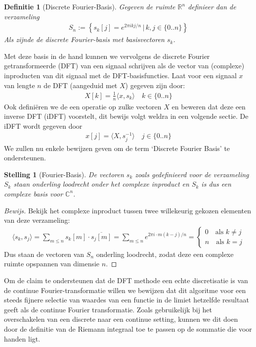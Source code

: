 \documentclass[11pt]{report}
\newcommand{\R}{\mathbb{R}}
\newcommand{\C}{\mathbb{C}}
\newtheorem*{stelling}{Stelling}
\newtheorem*{definitie}{Definitie}
\theoremstyle{remark}
\newcommand{\eq}[1]{\begin{eqnarray*} #1 \end{eqnarray*}}
\newcommand{\largediv}{\,\big|\,}
\newcommand{\inpr}[2]{\langle #1 , #2 \rangle}
\newcommand{\dpii}{{2\pi i}}
\begin{document}
\begin{definitie}[Discrete Fourier-Basis] Gegeven de ruimte $\R^n$ definieer dan de verzameling
\eq{
  S_n := \left\{ s_k [j] = e^{\dpii k j/n } \largediv k,j \in \{0..n\} \right\}
}
Als zijnde de discrete Fourier-basis met basisvectoren $s_k$.
\end{definitie}
Met deze basis in de hand kunnen we vervolgens de discrete Fourier getransformeerde (DFT) van een signaal schrijven als de vector van (complexe) inproducten van dit signaal met de DFT-basisfuncties. Laat voor een signaal $x$ van lengte $n$ de DFT (aangeduid met $X$) gegeven zijn door:
\eq{
  X[k] = \tfrac{1}{n} \inpr{x}{s_k} \quad k\in\{0..n\}
}
Ook defini\"eren we de een operatie op zulke vectoren $X$ en beweren dat deze een inverse DFT (iDFT) voorstelt, dit bewijs volgt weldra in een volgende sectie. De iDFT wordt gegeven door
\eq{
  x[j] = \inpr{X}{s_j^{-1}} \quad j\in \{0..n\}
}
We zullen nu enkele bewijzen geven om de term `Discrete Fourier Basis' te ondersteunen.

\begin{stelling}[Fourier-Basis]
  De vectoren $s_k$ zoals gedefinieerd voor de verzameling $S_k$ staan onderling loodrecht onder het complexe
  inproduct en $S_k$ is dus een complexe basis voor $\C^n$.
\end{stelling}
\begin{proof}[Bewijs]
  Bekijk het complexe inproduct tussen twee willekeurig gekozen elementen van deze verzameling:
  \eq{
    \inpr{s_k}{s_j} = \sum_{m\leq n} s_k[m]\cdot \overline{s_j[m]} = \sum_{m\leq n} e^{\dpii\cdot m (k-j)/n} =
    \begin{cases}
      0 \quad \text{als } k\neq j\\
      n \quad \text{als } k = j
    \end{cases}
  }
  Dus staan de vectoren van $S_n$ onderling loodrecht, zodat deze een complexe ruimte opspannen van dimensie $n$.
\end{proof}

Om de claim te ondersteunen dat de DFT methode een echte discretisatie is van de continue Fourier-transformatie willen we bewijzen dat dit algoritme voor een steeds fijnere selectie van waardes van een functie in de limiet hetzelfde resultaat geeft als de continue Fourier transformatie. 
Zoals gebruikelijk bij het overschakelen van een discrete naar een continue setting, kunnen we dit doen 
door de definitie van de Riemann integraal toe te passen op de sommatie die voor handen ligt.
\end{document}
